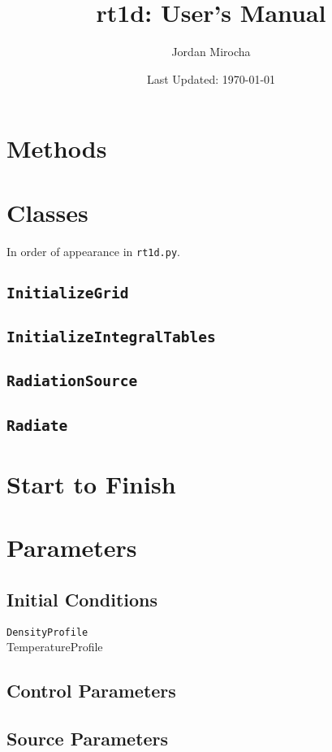 \documentclass[letterpaper,titlepage,12pt]{article}
\numberwithin{equation}{section}
\begin{document}
	
\author{Jordan Mirocha}	
	
\title{\Large {\bf rt1d: User's Manual}}
\date{Last Updated: \today}
\maketitle

\setcounter{tocdepth}{2}
\tableofcontents
\newpage

\section{Methods}

\section{Classes}
In order of appearance in \texttt{rt1d.py}.

\subsection{\texttt{InitializeGrid}}
\subsection{\texttt{InitializeIntegralTables}}
\subsection{\texttt{RadiationSource}}
\subsection{\texttt{Radiate}}

\section{Start to Finish}

\section{Parameters}

\subsection{Initial Conditions}
\begin{description}
    
\item [\texttt{DensityProfile}]  

\item [TemperatureProfile]  

\end{description}


\subsection{Control Parameters}


\subsection{Source Parameters}
\end{document}

